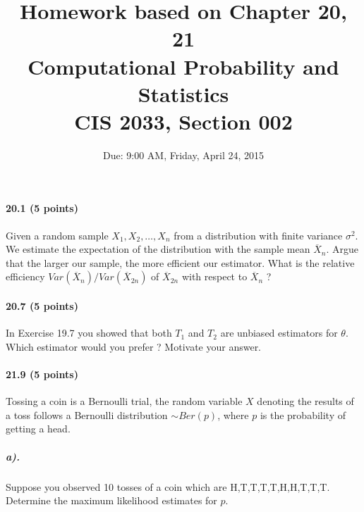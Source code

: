 \documentclass{article} %
\title{Homework based on Chapter 20, 21\\
Computational Probability and Statistics \\
CIS 2033, Section 002}
\author{Due: 9:00 AM, Friday, April 24, 2015}
\begin{document}
\maketitle

\paragraph*{20.1 (5 points)} Given a random sample $X_1, X_2, \ldots, X_n$ from a distribution with finite variance $\sigma^2$. We estimate the expectation of the distribution with the sample mean $\overline{X}_n$. Argue that the larger our sample, the more efficient our estimator. What is the relative efficiency $Var(\overline{X}_n)/Var(\overline{X}_{2n})$ of $\overline{X}_{2n}$ with respect to $\overline{X}_n$ ? 

%

\paragraph*{20.7 (5 points)}
In Exercise 19.7 you showed that both $T_1$ and $T_2$ are unbiased estimators for $\theta$. Which estimator would you prefer ? Motivate your answer. 


\paragraph*{21.9 (5 points)} Tossing a coin is a Bernoulli trial, the random variable $X$ denoting the results of a toss follows a Bernoulli distribution $\sim Ber(p)$, where $p$ is the probability of getting a head. 
\subparagraph*{a).} Suppose you observed 10 tosses of a coin which are H,T,T,T,T,H,H,T,T,T. Determine the maximum likelihood estimates for $p$. 
%
\end{document}
